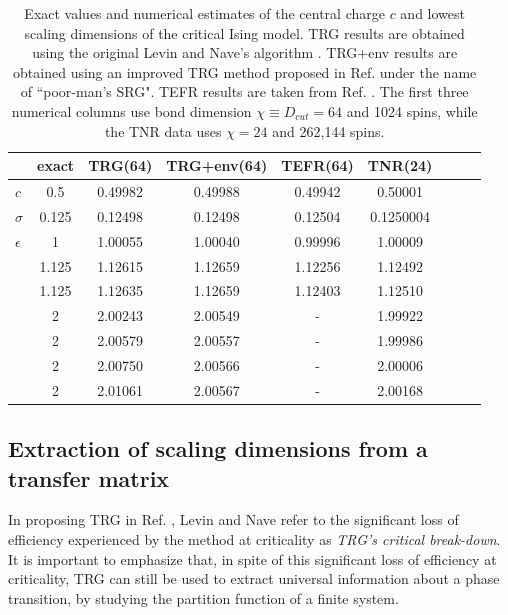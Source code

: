 \documentclass[aps,prl,twocolumn,showpacs,superscriptaddress,floatfix,10pt]{revtex4-1}
\begin{document}
\begin{table}[t]
  \centering
\begin{tabular}{l*{7}{c}r}
            & exact    & TRG(64) & TRG+env(64) & TEFR(64) & TNR(24) \\
\hline
$c$ &	 0.5 	& 0.49982 & 0.49988 & 0.49942 &  0.50001 \\
\hline
$\sigma$& 0.125 & 0.12498 & 0.12498 & 0.12504 &  0.1250004  \\
$\epsilon$&   1 & 1.00055 & 1.00040 & 0.99996 &  1.00009 \\
 & 1.125        & 1.12615 & 1.12659 & 1.12256 &  1.12492  \\
 & 1.125     & 1.12635 & 1.12659 & 1.12403    &  1.12510   \\
 & 2     	& 2.00243 & 2.00549 & - 	& 1.99922 \\ 
 & 2     	& 2.00579 & 2.00557 & - 	& 1.99986 \\ 
 & 2     	& 2.00750 & 2.00566 & - 	& 2.00006 \\ 
 & 2     	& 2.01061 & 2.00567 & - 	& 2.00168  
\end{tabular}
\caption{Exact values and numerical estimates of the central charge $c$ and lowest scaling dimensions of the critical Ising model. TRG results are obtained using the original Levin and Nave's algorithm \cite{TRG}. TRG+env results are obtained using an improved TRG method proposed in Ref. \cite{TRGenv} under the name of ``poor-man's SRG". TEFR results are taken from Ref. \cite{TEFR}. The first three numerical columns use bond dimension $\chi\equiv D_{cut}=64$ and 1024 spins, while the TNR data uses $\chi=24$ and 262,144 spins.}
\label{table}
\end{table}

\subsection{Extraction of scaling dimensions from a transfer matrix}

In proposing TRG in Ref. \cite{TRG}, Levin and Nave refer to the significant loss of efficiency experienced by the method at criticality as \textit{TRG's critical break-down}.  It is important to emphasize that, in spite of this significant loss of efficiency at criticality, TRG can still be used to extract universal information about a phase transition, by studying the partition function of a finite system. 
\end{document}
